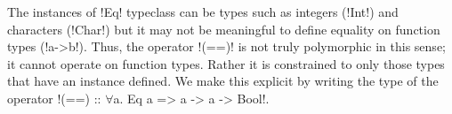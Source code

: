 \documentclass[format=sigplan,manuscript,review,screen,nonacm,margin=1in]{acmart}
\begin{document}
The instances of !Eq! typeclass can be types such as integers (!Int!) and characters (!Char!) but
it may not be meaningful to define equality on function types (!a->b!). Thus, the operator
!(==)! is not truly polymorphic in this sense; it cannot operate on function types. Rather
it is constrained to only those types that have an instance defined. We make this explicit by writing
the type of the operator !(==) :: $\forall$a. Eq a => a -> a -> Bool!. 

\end{document}
